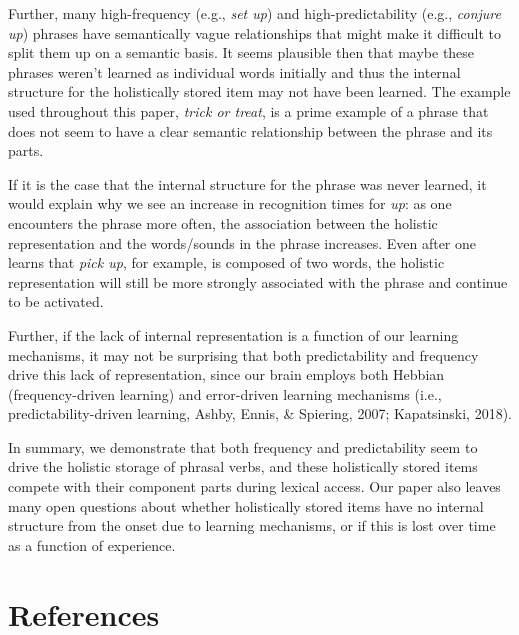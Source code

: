\documentclass[
  man,floatsintext]{apa6}
\begin{document}
Further, many high-frequency (e.g., \emph{set up}) and high-predictability (e.g., \emph{conjure up}) phrases have semantically vague relationships that might make it difficult to split them up on a semantic basis. It seems plausible then that maybe these phrases weren't learned as individual words initially and thus the internal structure for the holistically stored item may not have been learned. The example used throughout this paper, \emph{trick or treat}, is a prime example of a phrase that does not seem to have a clear semantic relationship between the phrase and its parts.

If it is the case that the internal structure for the phrase was never learned, it would explain why we see an increase in recognition times for \emph{up}: as one encounters the phrase more often, the association between the holistic representation and the words/sounds in the phrase increases. Even after one learns that \emph{pick up}, for example, is composed of two words, the holistic representation will still be more strongly associated with the phrase and continue to be activated.

Further, if the lack of internal representation is a function of our learning mechanisms, it may not be surprising that both predictability and frequency drive this lack of representation, since our brain employs both Hebbian (frequency-driven learning) and error-driven learning mechanisms (i.e., predictability-driven learning, Ashby, Ennis, \& Spiering, 2007; Kapatsinski, 2018).

In summary, we demonstrate that both frequency and predictability seem to drive the holistic storage of phrasal verbs, and these holistically stored items compete with their component parts during lexical access. Our paper also leaves many open questions about whether holistically stored items have no internal structure from the onset due to learning mechanisms, or if this is lost over time as a function of experience.

\newpage

\section{References}\label{references}
\end{document}
